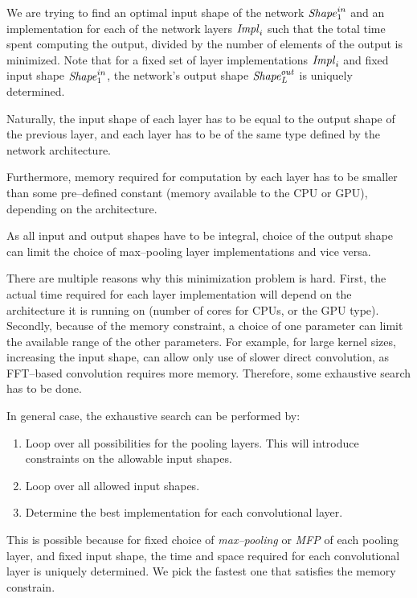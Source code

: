 \documentclass[conference]{IEEEtran}
\begin{document}
  We are trying to find an optimal input shape of the network
  $\id{Shape}^{in}_1$ and an implementation for each of the network
  layers $\id{Impl}_i$ such that the total time spent computing the
  output, divided by the number of elements of the output is
  minimized.  Note that for a fixed set of layer implementations
  $\id{Impl}_i$ and fixed input shape $\id{Shape}^{in}_1$, the
  network's output shape $\id{Shape}^{out}_L$ is uniquely determined.

  Naturally, the input shape of each layer has to be equal to the
  output shape of the previous layer, and each layer has to be of the
  same type defined by the network architecture.

  Furthermore, memory required for computation by each layer has to be
  smaller than some pre--defined constant (memory available to the CPU
  or GPU), depending on the architecture.

  As all input and output shapes have to be integral, choice of the
  output shape can limit the choice of max--pooling layer
  implementations and vice versa.

  There are multiple reasons why this minimization problem is hard.
  First, the actual time required for each layer implementation will
  depend on the architecture it is running on (number of cores for
  CPUs, or the GPU type).  Secondly, because of the memory constraint,
  a choice of one parameter can limit the available range of the other
  parameters.  For example, for large kernel sizes, increasing the
  input shape, can allow only use of slower direct convolution, as
  FFT--based convolution requires more memory.  Therefore, some
  exhaustive search has to be done.

  In general case, the exhaustive search can be performed by:

  \begin{enumerate}
    \item Loop over all possibilities for the pooling layers.  This
      will introduce constraints on the allowable input shapes.
    \item Loop over all allowed input shapes.
    \item Determine the best implementation for each convolutional
      layer.
  \end{enumerate}

  This is possible because for fixed choice of \emph{max--pooling} or
  \emph{MFP} of each pooling layer, and fixed input shape, the time
  and space required for each convolutional layer is uniquely
  determined.  We pick the fastest one that satisfies the memory
  constrain.
\end{document}
